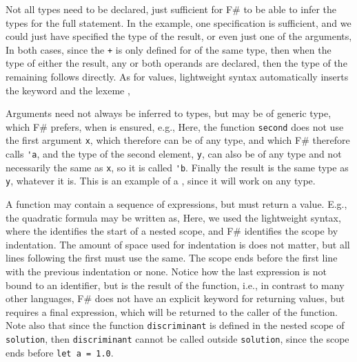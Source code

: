 Not all types need to be declared, just sufficient for F\# to be able to infer the types for the full statement. In the example, one specification is sufficient, and we could just have specified the type of the result,
%
%
or even just one of the arguments,
%
%
In both cases, since the \lstinline|+|  is only defined for  of the same type, then when the type of either the result, any or both operands are declared, then the type of the remaining follows directly.  As for values, lightweight syntax automatically inserts the keyword  and the lexeme \lexeme{;},
%
%

Arguments need not always be inferred to types, but may be of generic type, which F\# prefers, when  is ensured, e.g.,
%
%
Here, the function \lstinline{second} does not use the first argument \lstinline{x}, which therefore can be of any type, and which F\# therefore calls \lstinline{'a}, and the type of the second element, \lstinline{y}, can also be of any type and not necessarily the same as \lstinline!x!, so it is called \lstinline!'b!. Finally the result is the same type as \lstinline!y!, whatever it is. This is an example of a , since it will work on any type.

A function may contain a sequence of expressions, but must return a value. E.g., the quadratic formula may be written as, 
%
%
Here, we used the lightweight syntax, where the \lexeme{=} identifies the start of a nested scope, and F\# identifies the scope by indentation. The amount of space used for indentation is does not matter, but all lines following the first must use the same. The scope ends before the first line with the previous indentation or none. Notice how the last expression is not bound to an identifier, but is the result of the function, i.e., in contrast to many other languages, F\# does not have an explicit keyword for returning values, but requires a final expression, which will be returned to the caller of the function. Note also that since the function \lstinline!discriminant! is defined in the nested scope of \lstinline!solution!, then  \lstinline!discriminant! cannot be called outside \lstinline!solution!, since the scope ends before \lstinline!let a = 1.0!.

